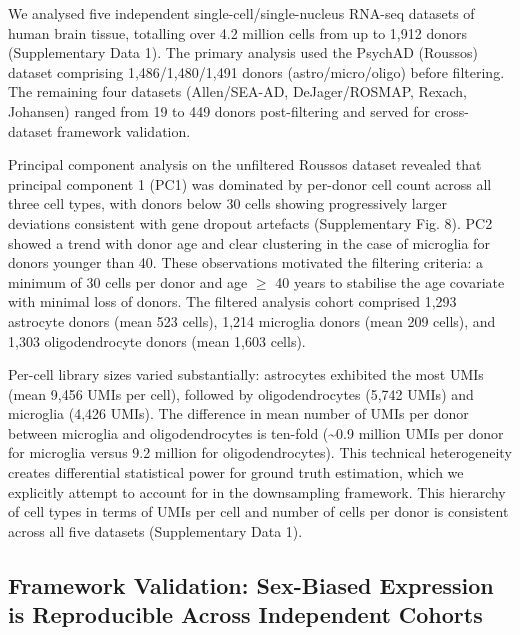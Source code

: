 \documentclass[
]{article}
\begin{document}
We analysed five independent single-cell/single-nucleus RNA-seq datasets
of human brain tissue, totalling over 4.2 million cells from up to 1,912
donors (Supplementary Data 1). The primary analysis used the PsychAD
(Roussos) dataset comprising 1,486/1,480/1,491 donors
(astro/micro/oligo) before filtering. The remaining four datasets
(Allen/SEA-AD, DeJager/ROSMAP, Rexach, Johansen) ranged from 19 to 449
donors post-filtering and served for cross-dataset framework validation.

Principal component analysis on the unfiltered Roussos dataset revealed
that principal component 1 (PC1) was dominated by per-donor cell count
across all three cell types, with donors below 30 cells showing
progressively larger deviations consistent with gene dropout artefacts
(Supplementary Fig. 8). PC2 showed a trend with donor age and clear
clustering in the case of microglia for donors younger than 40. These
observations motivated the filtering criteria: a minimum of 30 cells per
donor and age \(\geq\) 40 years to stabilise the age covariate with
minimal loss of donors. The filtered analysis cohort comprised 1,293
astrocyte donors (mean 523 cells), 1,214 microglia donors (mean 209
cells), and 1,303 oligodendrocyte donors (mean 1,603 cells).

Per-cell library sizes varied substantially: astrocytes exhibited the
most UMIs (mean 9,456 UMIs per cell), followed by oligodendrocytes
(5,742 UMIs) and microglia (4,426 UMIs). The difference in mean number
of UMIs per donor between microglia and oligodendrocytes is ten-fold
(\textasciitilde0.9 million UMIs per donor for microglia versus 9.2
million for oligodendrocytes). This technical heterogeneity creates
differential statistical power for ground truth estimation, which we
explicitly attempt to account for in the downsampling framework. This
hierarchy of cell types in terms of UMIs per cell and number of cells
per donor is consistent across all five datasets (Supplementary Data 1).

\subsection{Framework Validation: Sex-Biased Expression is Reproducible
Across Independent
Cohorts}\label{framework-validation-sex-biased-expression-is-reproducible-across-independent-cohorts}
\end{document}

